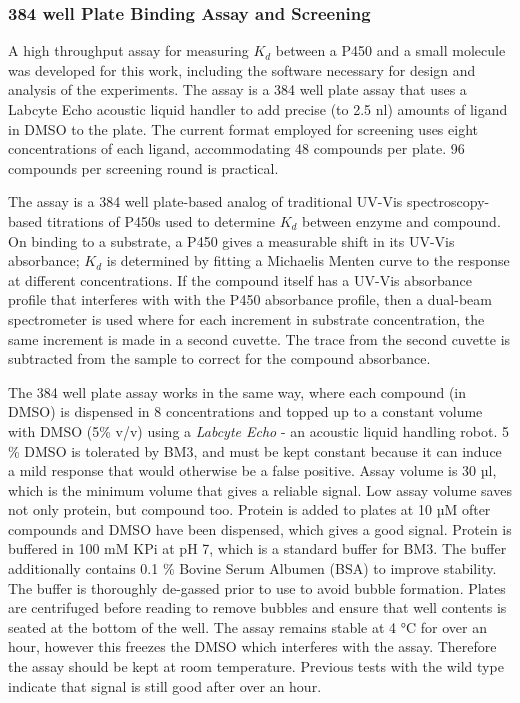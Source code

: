 \documentclass{article}
\begin{document}
\subsubsection{384 well Plate Binding Assay and Screening}
A high throughput assay for measuring $K_d$ between a P450 and a small molecule was developed for this work, including the software necessary for design and analysis of the experiments. The assay is a 384 well plate assay that uses a Labcyte Echo acoustic liquid handler to add precise (to 2.5 nl) amounts of ligand in DMSO to the plate. The current format employed for screening uses eight concentrations of each ligand, accommodating 48 compounds per plate. 96 compounds per screening round is practical.
\par
The assay is a 384 well plate-based analog of traditional UV-Vis spectroscopy-based titrations of P450s used to determine $K_d$ between enzyme and compound. On binding to a substrate, a P450 gives a measurable shift in its UV-Vis absorbance; $K_d$ is determined by fitting a Michaelis Menten curve to the response at different concentrations. If the compound itself has a UV-Vis absorbance profile that interferes with with the P450 absorbance profile, then a dual-beam spectrometer is used where for each increment in substrate concentration, the same increment is made in a second cuvette. The trace from the second cuvette is subtracted from the sample to correct for the compound absorbance.
\par
The 384 well plate assay works in the same way, where each compound (in DMSO) is dispensed in 8 concentrations and topped up to a constant volume with DMSO (5\% v/v) using a \textit{Labcyte Echo} - an acoustic liquid handling robot. 5 \% DMSO is tolerated by BM3, and must be kept constant because it can induce a mild response that would otherwise be a false positive. Assay volume is 30 µl, which is the minimum volume that gives a reliable signal. Low assay volume saves not only protein, but compound too. Protein is added to plates at 10 µM ofter compounds and DMSO have been dispensed, which gives a good signal. Protein is buffered in 100 mM KPi at pH 7, which is a standard buffer for BM3. The buffer additionally contains 0.1 \% Bovine Serum Albumen (BSA) to improve stability. The buffer is thoroughly de-gassed prior to use to avoid bubble formation. Plates are centrifuged before reading to remove bubbles and ensure that well contents is seated at the bottom of the well. The assay remains stable at 4 °C for over an hour, however this freezes the DMSO which interferes with the assay. Therefore the assay should be kept at room temperature. Previous tests with the wild type indicate that signal is still good after over an hour.
\end{document}

